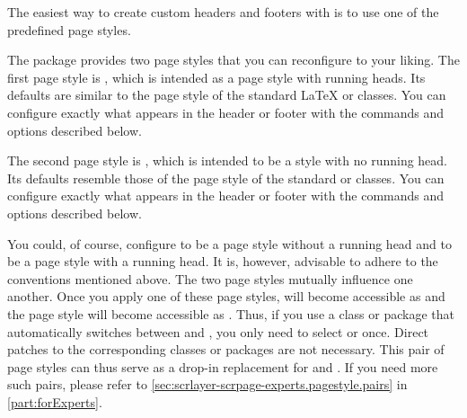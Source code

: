 The easiest way to create custom headers and footers with
 is to use one of the predefined page styles.
%
\iffalse %
  This section introduces the page styles defined by the
  \Package{scrlayer-scrpage} package as it loads. It also explains the
  commands that you can use to create basic settings for these page
  styles. You can find further options, commands, and background information
  in the following sections and in
  \autoref{sec:scrlayer-scrpage-experts.pagestyle.pairs} in
  \autoref{part:forExperts}.%
\fi

\begin{Declaration}
\end{Declaration}
The  package provides two page styles that you can
reconfigure to your liking. The first page style is
, which is intended
as a page style with running heads. Its defaults are similar to the page style
 of the standard \LaTeX{} or
\KOMAScript{} classes. You can configure exactly what appears in the header or
footer with the commands and options described below.

The second page style is %
, which is intended to be a style
with no running head. Its defaults resemble those of the
 page style of the standard or
\KOMAScript{} classes. You can configure exactly what appears in the header or
footer with the commands and options described below.

You could, of course, configure  to be a page style
without a running head and  to be a page style
with a running head. It is, however, advisable to adhere to the conventions
mentioned above. The two page styles mutually influence one another. Once you
apply one of these page styles,  will become accessible
as %
 and the page style 
will become accessible as %
. Thus, if you use a class or package that automatically
switches between  and , you only need to
select  or  once. Direct
patches to the corresponding classes or packages are not necessary. This pair
of page styles can thus serve as a drop-in replacement for
 and . If you need more such pairs,
please refer to \autoref{sec:scrlayer-scrpage-experts.pagestyle.pairs} in
\autoref{part:forExperts}.%
\EndIndexGroup



